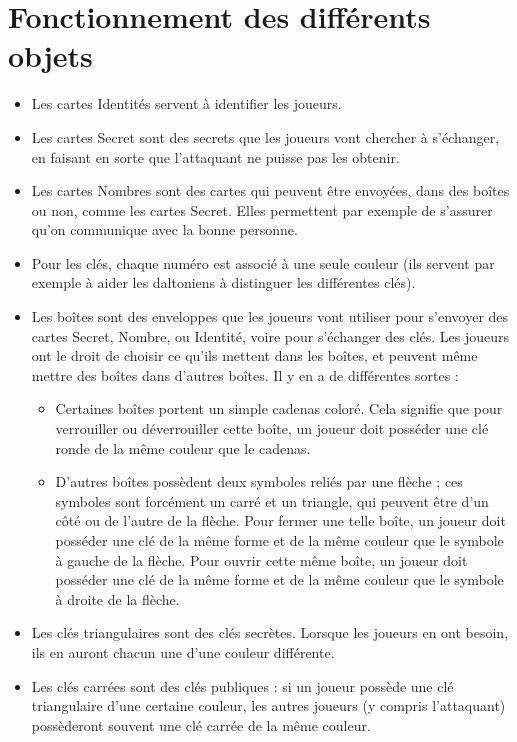 \documentclass[a4paper,10pt]{article}
\begin{document}
\section{Fonctionnement des différents objets}
\begin{itemize}
	\item Les cartes Identités servent à identifier les joueurs.
	\item Les cartes Secret sont des secrets que les joueurs vont chercher à s'échanger, en faisant en sorte que l'attaquant ne puisse pas les obtenir.
	\item Les cartes Nombres sont des cartes qui peuvent être envoyées, dans des boîtes ou non, comme les cartes Secret. Elles permettent par exemple de s'assurer qu'on communique avec la bonne personne.
	\item Pour les clés, chaque numéro est associé à une seule couleur (ils servent par exemple à aider les daltoniens à distinguer les différentes clés).
	\item Les boîtes sont des enveloppes que les joueurs vont utiliser pour s'envoyer des cartes Secret, Nombre, ou Identité, voire pour s'échanger des clés. Les joueurs ont le droit de choisir ce qu'ils mettent dans les boîtes, et peuvent même mettre des boîtes dans d'autres boîtes. Il y en a de différentes sortes :
		\begin{itemize}
			\item Certaines boîtes portent un simple cadenas coloré. Cela signifie que pour verrouiller ou déverrouiller cette boîte, un joueur doit posséder une clé ronde de la même couleur que le cadenas.
			\item D'autres boîtes possèdent deux symboles reliés par une flèche ; ces symboles sont forcément un carré et un triangle, qui peuvent être d'un côté ou de l'autre de la flèche. Pour fermer une telle boîte, un joueur doit posséder une clé de la même forme et de la même couleur que le symbole à gauche de la flèche. Pour ouvrir cette même boîte, un joueur doit posséder une clé de la même forme et de la même couleur que le symbole à droite de la flèche. 
		\end{itemize}
	\item Les clés triangulaires sont des clés secrètes. Lorsque les joueurs en ont besoin, ils en auront chacun une d'une couleur différente.
	\item Les clés carrées sont des clés publiques : si un joueur possède une clé triangulaire d'une certaine couleur, les autres joueurs (y compris l'attaquant) possèderont souvent une clé carrée de la même couleur.
\end{itemize}
\end{document}

